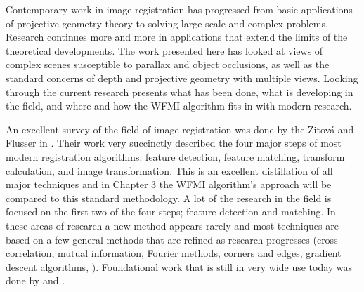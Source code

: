 %
%
%
%
%
%
%
%
%

%
%
%



Contemporary work in image registration has progressed from basic applications of projective geometry theory to solving large-scale and complex problems. Research continues more and more in applications that extend the limits of the theoretical developments. The work presented here has looked at views of complex scenes susceptible to parallax and object occlusions, as well as the standard concerns of depth and projective geometry with multiple views. Looking through the current research presents what has been done, what is developing in the field, and where and how the WFMI algorithm fits in with modern research.

 An excellent survey of the field of image registration was done by the Zitov{\'a} and Flusser in \cite{Zitova2003}. Their work very succinctly described the four major steps of most modern registration algorithms: feature detection, feature matching, transform calculation, and image transformation. This is an excellent distillation of all major techniques and in Chapter 3 the WFMI algorithm's approach will be compared to this standard methodology. A lot of the research in the field is focused on the first two of the four steps; feature detection and matching. In these areas of research a new method appears rarely and most techniques are based on a few general methods that are refined as research progresses (cross-correlation, mutual information, Fourier methods, corners and edges, gradient descent algorithms, \etc). Foundational work that is still in very wide use today was done by \cite{Brown2003} and \cite{Brown2005}.
 
